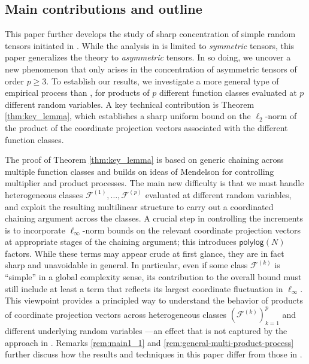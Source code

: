 \documentclass[numbers,webpdf,imaiai]{ima-authoring-template}
\theoremstyle{thmstyletwo}%
\numberwithin{equation}{section}
\numberwithin{equation}{section}
\newcommand{\F}{\mathcal{F}}
\begin{document}
\subsection{ Main 
 contributions and outline}
This paper further develops the study of sharp concentration of simple random tensors initiated in \cite{al2025sharp}. While the analysis in \cite{al2025sharp} is limited to \emph{symmetric} tensors,
this paper generalizes the theory to \emph{asymmetric} tensors. In so doing, 
we uncover a new phenomenon that only arises in the concentration of asymmetric tensors of order $p \ge 3$. To establish our results, we investigate a more general type of empirical process than \cite{al2025sharp}, for products of $p$ different function classes evaluated at $p$ different random variables. A key technical contribution is Theorem \ref{thm:key_lemma}, which establishes a sharp uniform bound on the $\ell_2$-norm of the product of the coordinate projection vectors associated with the different function classes. 

The proof of Theorem \ref{thm:key_lemma} is based on generic chaining across multiple function classes and builds on ideas of Mendelson \cite{mendelson2016upper} for controlling multiplier and product processes. The main new difficulty is that we must handle heterogeneous classes $\F^{(1)},\ldots,\F^{(p)}$ evaluated at different random variables, and exploit the resulting multilinear structure to carry out a coordinated chaining argument across the classes.  A crucial step in controlling the increments is to incorporate $\ell_{\infty}$-norm bounds on the relevant coordinate projection vectors at appropriate stages of the chaining argument; this introduces $\mathsf{polylog}(N)$ factors. While these terms may appear crude at first glance, they are in fact sharp and unavoidable in general. In particular, even if some class $\F^{(k)}$ is ``simple'' in a global complexity sense, its contribution to the overall bound must still include at least a term that reflects its largest coordinate fluctuation in $\ell_{\infty}$. This viewpoint provides a principled way to understand the behavior of products of coordinate projection vectors across heterogeneous classes $(\F^{(k)})_{k=1}^{p}$ and different underlying random variables ---an effect that is not captured by the approach in \cite{al2025sharp}. 
Remarks \ref{rem:main1_1} and \ref{rem:general-multi-product-process} further discuss how the results and techniques in this paper differ from those in \cite{al2025sharp}.
\end{document}
